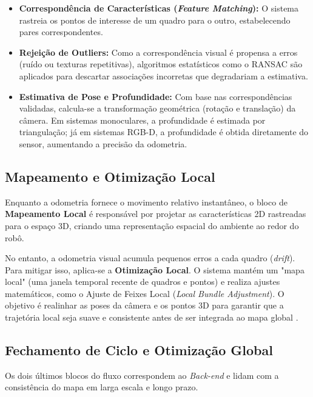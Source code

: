 \begin{itemize}
    \item \textbf{Correspondência de Características (\textit{Feature Matching}):} O sistema rastreia os pontos de interesse de um quadro para o outro, estabelecendo pares correspondentes.
    \item \textbf{Rejeição de Outliers:} Como a correspondência visual é propensa a erros (ruído ou texturas repetitivas), algoritmos estatísticos como o RANSAC são aplicados para descartar associações incorretas que degradariam a estimativa.
    \item \textbf{Estimativa de Pose e Profundidade:} Com base nas correspondências validadas, calcula-se a transformação geométrica (rotação e translação) da câmera. Em sistemas monoculares, a profundidade é estimada por triangulação; já em sistemas RGB-D, a profundidade é obtida diretamente do sensor, aumentando a precisão da odometria.
\end{itemize}

\subsection{Mapeamento e Otimização Local}

Enquanto a odometria fornece o movimento relativo instantâneo, o bloco de \textbf{Mapeamento Local} é responsável por projetar as características 2D rastreadas para o espaço 3D, criando uma representação espacial do ambiente ao redor do robô.

No entanto, a odometria visual acumula pequenos erros a cada quadro (\textit{drift}). Para mitigar isso, aplica-se a \textbf{Otimização Local}. O sistema mantém um "mapa local" (uma janela temporal recente de quadros e pontos) e realiza ajustes matemáticos, como o Ajuste de Feixes Local (\textit{Local Bundle Adjustment}). O objetivo é realinhar as poses da câmera e os pontos 3D para garantir que a trajetória local seja suave e consistente antes de ser integrada ao mapa global \cite{mur-artal2015orbslamversatileaccurate}.

\subsection{Fechamento de Ciclo e Otimização Global}

Os dois últimos blocos do fluxo correspondem ao \textit{Back-end} e lidam com a consistência do mapa em larga escala e longo prazo.

